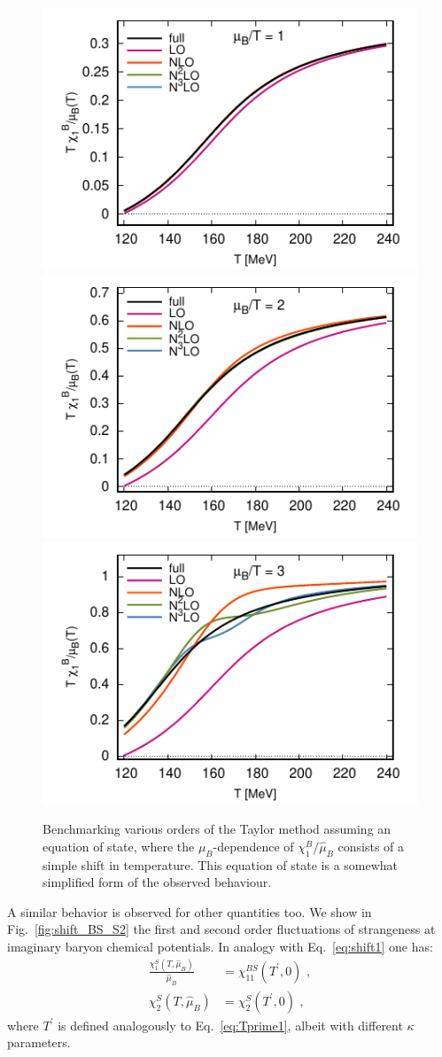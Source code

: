\documentclass[aps,prd,twocolumn,superscriptaddress]{revtex4-2}
\newcommand \hmu {\hat{\mu}}
\begin{document}
\begin{figure}[t]
\center
\includegraphics[width=0.32\linewidth]{figures/mock_chiB1_mu1.pdf}
\includegraphics[width=0.32\linewidth]{figures/mock_chiB1_mu2.pdf}
\includegraphics[width=0.32\linewidth]{figures/mock_chiB1_mu3.pdf}
\caption{Benchmarking various orders of the Taylor method assuming
an equation of state, where the $\mu_B$-dependence of $\chi^B_1/\hmu_B$ 
consists of a simple shift in temperature. This equation of state
is a somewhat simplified form of the observed behaviour.}
\label{fig:mock}
\end{figure}

A similar behavior is observed for other quantities too. 
We show in Fig.~\ref{fig:shift_BS_S2} the first and 
second order fluctuations of strangeness at imaginary 
baryon chemical potentials. In analogy with 
Eq.~\eqref{eq:shift1} one has:
\begin{align}
\frac{\chi_1^S(T,\hmu_B)}{\hmu_B} &= \chi_{11}^{BS} (T^\prime,0) \, \,  , \\ \nonumber
\chi_2^S(T,\hmu_B) &= \chi_2^S (T^\prime,0) \, \,  , 
\end{align}
where $T^\prime$ is defined analogously to
Eq.~\eqref{eq:Tprime1}, albeit with different $\kappa$
parameters.
\end{document}
